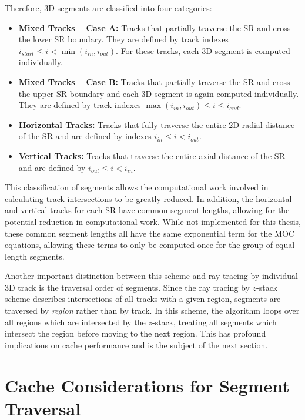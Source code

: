 Therefore, 3D segments are classified into four categories:

\begin{itemize}
	\item \textbf{Mixed Tracks -- Case A:} Tracks that partially traverse the \ac{SR} and cross the lower \ac{SR} boundary. They are defined by track indexes $i_{\textit{start}} \leq i < \min\left(i_{\textit{in}}, i_{\textit{out}}\right)$. For these tracks, each 3D segment is computed individually. 
	\item \textbf{Mixed Tracks -- Case B:} Tracks that partially traverse the \ac{SR} and cross the upper \ac{SR} boundary and each 3D segment is again computed individually. They are defined by track indexes $\max\left(i_{\textit{in}}, i_{\textit{out}}\right)  \leq i  \leq i_{\textit{end}}$.
	\item \textbf{Horizontal Tracks:} Tracks that fully traverse the entire 2D radial distance of the \ac{SR} and are defined by indexes $i_{\textit{in}} \leq i < i_{\textit{out}}$. 
	\item \textbf{Vertical Tracks:} Tracks that traverse the entire axial distance of the \ac{SR} and are defined by $i_{\textit{out}} \leq i < i_{\textit{in}}$.
\end{itemize}

This classification of segments allows the computational work involved in calculating track intersections to be greatly reduced. In addition, the horizontal and vertical tracks for each \ac{SR} have common segment lengths, allowing for the potential reduction in computational work. While not implemented for this thesis, these common segment lengths all have the same exponential term for the \ac{MOC} equations, allowing these terms to only be computed once for the group of equal length segments.

Another important distinction between this scheme and ray tracing by individual 3D track is the traversal order of segments. Since the ray tracing by $z$-stack scheme describes intersections of all tracks with a given region, segments are traversed by \textit{region} rather than by track. In this scheme, the algorithm loops over all regions which are intersected by the $z$-stack, treating all segments which intersect the region before moving to the next region. This has profound implications on cache performance and is the subject of the next section.

\section{Cache Considerations for Segment Traversal}

